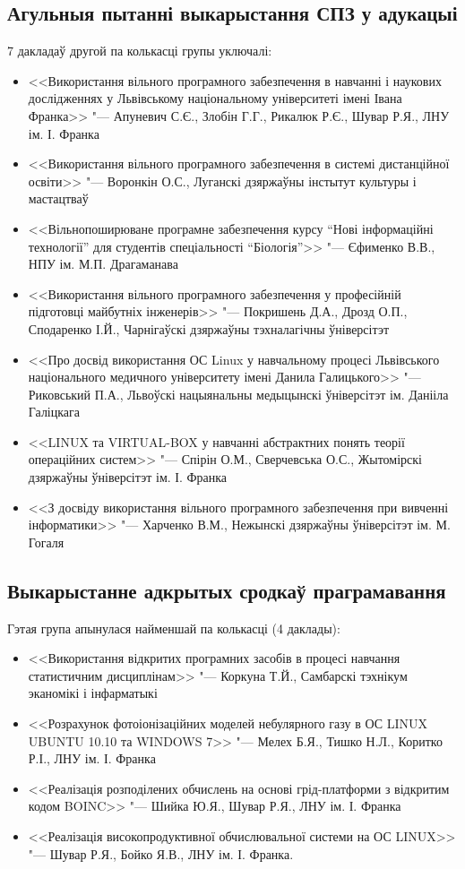 \documentclass[10pt, a5paper]{article}
\begin{document}
\subsection*{Агульныя пытанні выкарыстання СПЗ у адукацыі}
7 дакладаў другой па колькасці групы уключалі:
\begin{itemize}
\item <<Використання вільного програмного забезпечення в навчанні і наукових дослідженнях у Львівському національному уні\-вер\-ситеті імені Івана Франка>> "--- Апуневич С.Є., Злобін Г.Г., Рикалюк Р.Є., Шувар Р.Я., ЛНУ ім. І. Франка
\item <<Використання вільного програмного забезпечення в системі дистанційної освіти>> "--- Воронкін О.С., Луганскі дзяржаўны інстытут культуры і мастацтваў
\item <<Вільнопоширюване програмне забезпечення курсу “Нові інформаційні технології” для студентів спеціальності \linebreak “Біо\-ло\-гія”>> "--- Єфименко В.В., НПУ ім. М.П. Драгаманава
\item <<Використання вільного програмного забез\-печення у про\-фе\-сій\-ній підготовці майбутніх інженерів>> "--- Покришень Д.А., \linebreak Дрозд О.П., Сподаренко І.Й., Чарнігаўскі дзяржаўны тэхналагічны ўніверсітэт
\item  <<Про досвід використання ОС Linux у навчальному процесі Львівського національного медичного університету імені Данила Галицького>> "--- Риковський П.А., Львоўскі нацыянальны медыцынскі ўніверсітэт ім. Данііла Галіцкага
\item  <<LINUX  та VIRTUAL-BOX у навчанні абстрактних понять теорії операційних систем>> "--- Спірін О.М., Сверчевська О.С., Жытомірскі дзяржаўны ўніверсітэт ім. І. Франка
\item  <<З досвіду використання вільного програмного забезпечення при вивченні інформатики>> "--- Харченко В.М., Нежынскі дзяржаўны ўніверсітэт ім. М. Гогаля
\end{itemize}

\subsection*{Выкарыстанне адкрытых сродкаў праграмавання}
Гэтая група апынулася найменшай па колькасці (4 даклады):
\begin{itemize}
\item <<Використання відкритих програмних засобів в процесі навчання статистичним дисциплінам>> "--- Коркуна Т.Й., Самбарскі тэхнікум эканомікі і інфарматыкі
\item <<Розрахунок фотоіонізаційних моделей небулярного газу в ОС LINUX UBUNTU 10.10 та WINDOWS 7>> "--- Мелех Б.Я., Тишко Н.Л., Коритко Р.І., ЛНУ ім. І. Франка
\item <<Реалізація розподілених обчислень на основі грід-платформи з відкритим кодом BOINC>> "--- Шийка Ю.Я., Шувар Р.Я., ЛНУ ім. І. Франка
\item <<Реалізація високопродуктивної обчислювальної системи на ОС  LINUX>> "--- Шувар Р.Я., Бойко Я.В., ЛНУ ім. І. Франка.
\end{itemize}
\end{document}
